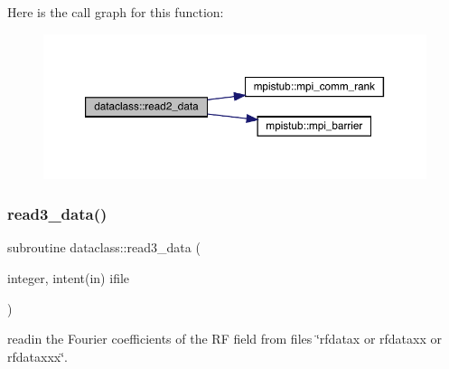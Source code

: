 Here is the call graph for this function\+:\nopagebreak
\begin{figure}[H]
\begin{center}
\leavevmode
\includegraphics[width=350pt]{namespacedataclass_abf0c8413e040d7ea8c0bc5df73c9ef96_cgraph}
\end{center}
\end{figure}
\mbox{\label{namespacedataclass_a39afae6095340e01362de7d4876aee60}} 
\subsubsection{\texorpdfstring{read3\_data()}{read3\_data()}}
{\footnotesize\ttfamily subroutine dataclass\+::read3\+\_\+data (\begin{DoxyParamCaption}\item[{integer, intent(in)}]{ifile }\end{DoxyParamCaption})}



readin the Fourier coefficients of the RF field from files \char`\"{}rfdatax or rfdataxx or rfdataxxx\char`\"{}. 

